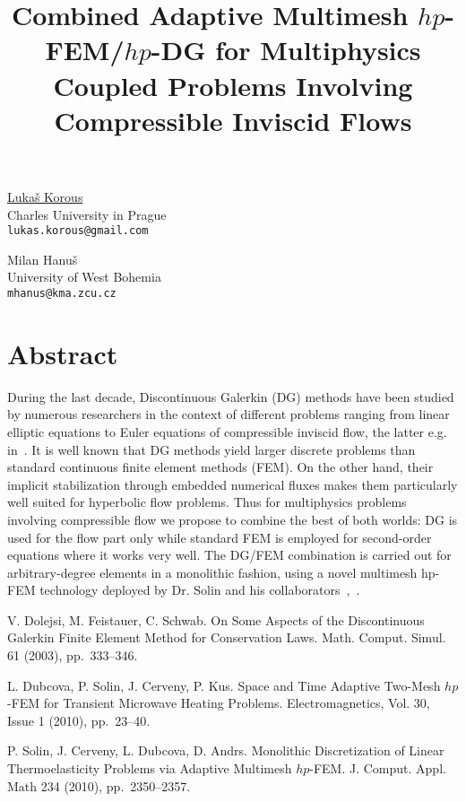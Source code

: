 \title{Combined Adaptive Multimesh $hp$-FEM/$hp$-DG for Multiphysics Coupled Problems Involving Compressible Inviscid Flows}
\author{} \institute{}
\maketitle

\begin{center}
{\large \underline{Luka\v s Korous}}\\
Charles University in Prague\\
{\tt lukas.korous@gmail.com}\\
\vspace{4mm}

{\large Milan Hanu\v s}\\
University of West Bohemia\\
{\tt mhanus@kma.zcu.cz}
\end{center}

\section*{Abstract}
During the last decade, Discontinuous Galerkin (DG) methods have been studied by numerous researchers in the context of different problems ranging from linear elliptic equations to Euler equations of compressible inviscid flow, the latter e.g. in~\cite{1}. It is well known that DG methods yield larger discrete problems than standard continuous finite element methods (FEM). On the other hand, their implicit stabilization through embedded numerical fluxes makes them particularly well
suited for hyperbolic flow problems. Thus for multiphysics problems involving compressible flow we propose to combine the best of both worlds: DG is used for the flow part only while standard FEM is employed for second-order equations where it works very well. The DG/FEM combination is carried out for arbitrary-degree elements in a monolithic fashion, using a novel multimesh hp-FEM technology deployed by Dr. Solin and his collaborators~\cite{2},~\cite{3}.


\begin{thebibliography}{10}
{\sc V. Dolejsi, M. Feistauer, C. Schwab}. {On Some Aspects of the Discontinuous Galerkin Finite Element Method for Conservation Laws}. Math. Comput. Simul. 61 (2003), pp.~333--346.

{\sc L. Dubcova, P. Solin, J. Cerveny, P. Kus}. {Space and Time Adaptive Two-Mesh $hp$-FEM for Transient Microwave Heating Problems}. Electromagnetics, Vol. 30, Issue 1 (2010), pp.~23--40.

{\sc P. Solin, J. Cerveny, L. Dubcova, D. Andrs}. {Monolithic Discretization of Linear Thermoelasticity Problems via Adaptive Multimesh $hp$-FEM}. J. Comput. Appl. Math 234 (2010), pp.~2350--2357.
\end{thebibliography}